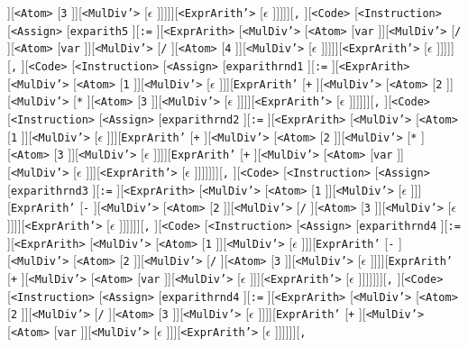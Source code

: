 \documentclass[border=5pt]{standalone}
\begin{document}
][{\texttt{<Atom>}} [{\texttt{3}} ]][{\texttt{<MulDiv'>}} [{$\epsilon$} ]]]]][{\texttt{<ExprArith'>}} [{$\epsilon$} ]]]]][{\texttt{,}} ][{\texttt{<Code>}} [{\texttt{<Instruction>}} [{\texttt{<Assign>}} [{\texttt{exparith5}} ][{\texttt{:=}} ][{\texttt{<ExprArith>}} [{\texttt{<MulDiv'>}} [{\texttt{<Atom>}} [{\texttt{var}} ]][{\texttt{<MulDiv'>}} [{\texttt{/}} ][{\texttt{<Atom>}} [{\texttt{var}} ]][{\texttt{<MulDiv'>}} [{\texttt{/}} ][{\texttt{<Atom>}} [{\texttt{4}} ]][{\texttt{<MulDiv'>}} [{$\epsilon$} ]]]]][{\texttt{<ExprArith'>}} [{$\epsilon$} ]]]]][{\texttt{,}} ][{\texttt{<Code>}} [{\texttt{<Instruction>}} [{\texttt{<Assign>}} [{\texttt{exparithrnd1}} ][{\texttt{:=}} ][{\texttt{<ExprArith>}} [{\texttt{<MulDiv'>}} [{\texttt{<Atom>}} [{\texttt{1}} ]][{\texttt{<MulDiv'>}} [{$\epsilon$} ]]][{\texttt{ExprArith'}} [{\texttt{+}} ][{\texttt{<MulDiv'>}} [{\texttt{<Atom>}} [{\texttt{2}} ]][{\texttt{<MulDiv'>}} [{\texttt{*}} ][{\texttt{<Atom>}} [{\texttt{3}} ]][{\texttt{<MulDiv'>}} [{$\epsilon$} ]]]][{\texttt{<ExprArith'>}} [{$\epsilon$} ]]]]]][{\texttt{,}} ][{\texttt{<Code>}} [{\texttt{<Instruction>}} [{\texttt{<Assign>}} [{\texttt{exparithrnd2}} ][{\texttt{:=}} ][{\texttt{<ExprArith>}} [{\texttt{<MulDiv'>}} [{\texttt{<Atom>}} [{\texttt{1}} ]][{\texttt{<MulDiv'>}} [{$\epsilon$} ]]][{\texttt{ExprArith'}} [{\texttt{+}} ][{\texttt{<MulDiv'>}} [{\texttt{<Atom>}} [{\texttt{2}} ]][{\texttt{<MulDiv'>}} [{\texttt{*}} ][{\texttt{<Atom>}} [{\texttt{3}} ]][{\texttt{<MulDiv'>}} [{$\epsilon$} ]]]][{\texttt{ExprArith'}} [{\texttt{+}} ][{\texttt{<MulDiv'>}} [{\texttt{<Atom>}} [{\texttt{var}} ]][{\texttt{<MulDiv'>}} [{$\epsilon$} ]]][{\texttt{<ExprArith'>}} [{$\epsilon$} ]]]]]]][{\texttt{,}} ][{\texttt{<Code>}} [{\texttt{<Instruction>}} [{\texttt{<Assign>}} [{\texttt{exparithrnd3}} ][{\texttt{:=}} ][{\texttt{<ExprArith>}} [{\texttt{<MulDiv'>}} [{\texttt{<Atom>}} [{\texttt{1}} ]][{\texttt{<MulDiv'>}} [{$\epsilon$} ]]][{\texttt{ExprArith'}} [{\texttt{-}} ][{\texttt{<MulDiv'>}} [{\texttt{<Atom>}} [{\texttt{2}} ]][{\texttt{<MulDiv'>}} [{\texttt{/}} ][{\texttt{<Atom>}} [{\texttt{3}} ]][{\texttt{<MulDiv'>}} [{$\epsilon$} ]]]][{\texttt{<ExprArith'>}} [{$\epsilon$} ]]]]]][{\texttt{,}} ][{\texttt{<Code>}} [{\texttt{<Instruction>}} [{\texttt{<Assign>}} [{\texttt{exparithrnd4}} ][{\texttt{:=}} ][{\texttt{<ExprArith>}} [{\texttt{<MulDiv'>}} [{\texttt{<Atom>}} [{\texttt{1}} ]][{\texttt{<MulDiv'>}} [{$\epsilon$} ]]][{\texttt{ExprArith'}} [{\texttt{-}} ][{\texttt{<MulDiv'>}} [{\texttt{<Atom>}} [{\texttt{2}} ]][{\texttt{<MulDiv'>}} [{\texttt{/}} ][{\texttt{<Atom>}} [{\texttt{3}} ]][{\texttt{<MulDiv'>}} [{$\epsilon$} ]]]][{\texttt{ExprArith'}} [{\texttt{+}} ][{\texttt{<MulDiv'>}} [{\texttt{<Atom>}} [{\texttt{var}} ]][{\texttt{<MulDiv'>}} [{$\epsilon$} ]]][{\texttt{<ExprArith'>}} [{$\epsilon$} ]]]]]]][{\texttt{,}} ][{\texttt{<Code>}} [{\texttt{<Instruction>}} [{\texttt{<Assign>}} [{\texttt{exparithrnd4}} ][{\texttt{:=}} ][{\texttt{<ExprArith>}} [{\texttt{<MulDiv'>}} [{\texttt{<Atom>}} [{\texttt{2}} ]][{\texttt{<MulDiv'>}} [{\texttt{/}} ][{\texttt{<Atom>}} [{\texttt{3}} ]][{\texttt{<MulDiv'>}} [{$\epsilon$} ]]]][{\texttt{ExprArith'}} [{\texttt{+}} ][{\texttt{<MulDiv'>}} [{\texttt{<Atom>}} [{\texttt{var}} ]][{\texttt{<MulDiv'>}} [{$\epsilon$} ]]][{\texttt{<ExprArith'>}} [{$\epsilon$} ]]]]]][{\texttt{,}} 
\end{document}
